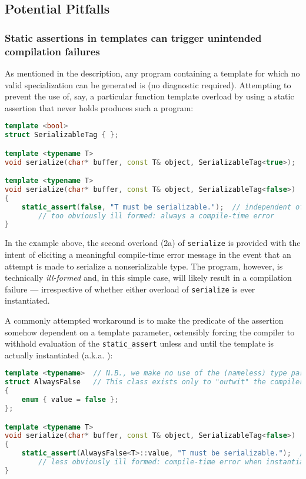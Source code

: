 \subsection[Potential Pitfalls]{Potential Pitfalls}\label{static-potential-pitfalls}

\subsubsection[Static assertions in templates can trigger unintended compilation failures]{Static assertions in templates can trigger unintended compilation failures}\label{static-assertions-in-templates-can-trigger-unintended-compilation-failures}

As mentioned in the description, any program containing a template for
which no valid specialization can be generated is
 (no diagnostic required). Attempting to prevent the
use of, say, a particular function template overload by using a static
assertion that never holds produces such a program:

\begin{lstlisting}[language=C++]
template <bool>
struct SerializableTag { };

template <typename T>
void serialize(char* buffer, const T& object, SerializableTag<true>);  // (1)

template <typename T>
void serialize(char* buffer, const T& object, SerializableTag<false>)  // (2a)
{
    static_assert(false, "T must be serializable.");  // independent of (ù{\codeincomments{T}}ù)
        // too obviously ill formed: always a compile-time error
}
\end{lstlisting}

\noindent In the example above, the second overload (2a) of \lstinline!serialize! is
provided with the intent of eliciting a meaningful compile-time error
message in the event that an attempt is made to serialize a
nonserializable type. The program, however, is technically
\emph{ill-formed} and, in this simple case, will likely result in a
compilation failure --- irrespective of whether either overload of
\lstinline!serialize! is ever instantiated.

A commonly attempted workaround
is to make the predicate of the assertion somehow dependent on a
template parameter, ostensibly forcing the compiler to withhold
evaluation of the \lstinline!static_assert! unless and until the template
is actually instantiated (a.k.a. ):

\begin{lstlisting}[language=C++]
template <typename>  // N.B., we make no use of the (nameless) type parameter:
struct AlwaysFalse   // This class exists only to "outwit" the compiler.
{
    enum { value = false };
};

template <typename T>
void serialize(char* buffer, const T& object, SerializableTag<false>)  // (2b)
{
    static_assert(AlwaysFalse<T>::value, "T must be serializable.");  // OK
        // less obviously ill formed: compile-time error when instantiated
}
\end{lstlisting}

